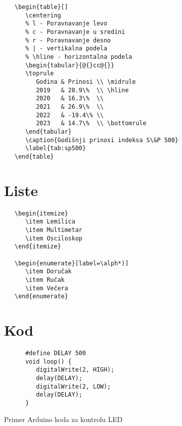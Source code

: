 \begin{verbatim}
   \begin{table}[]
      \centering
      % l - Poravnavanje levo
      % c - Poravnavanje u sredini
      % r - Poravnavanje desno
      % | - vertikalna podela
      % \hline - horizontalna podela
      \begin{tabular}{@{}cc@{}}
      \toprule
         Godina & Prinosi \\ \midrule
         2019   & 28.9\%  \\ \hline
         2020   & 16.3\%  \\
         2021   & 26.9\%  \\
         2022   & -19.4\% \\
         2023   & 14.7\%  \\ \bottomrule
      \end{tabular}
      \caption{Godišnji prinosi indeksa S\&P 500}
      \label{tab:sp500}
   \end{table}
\end{verbatim}

\pagebreak

\section*{Liste}

\begin{verbatim}
   \begin{itemize}
      \item Lemilica
      \item Multimetar
      \item Osciloskop
   \end{itemize}

   \begin{enumerate}[label=\alph*)]
      \item Doručak
      \item Ručak
      \item Večera
   \end{enumerate}
\end{verbatim}

\pagebreak

\section*{Kod}

\begin{listing}[h]
   \begin{verbatim}
      #define DELAY 500
      void loop() {
         digitalWrite(2, HIGH);
         delay(DELAY);
         digitalWrite(2, LOW);
         delay(DELAY);
      }
   \end{verbatim}
   \label{ls:arduino}
   \caption{Primer Arduino koda za kontrolu LED}
\end{listing}



